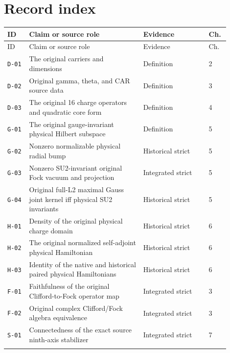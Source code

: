 \section{Record index}
\begingroup\small
\begin{longtable}{@{}p{0.09\linewidth}p{0.47\linewidth}p{0.27\linewidth}p{0.07\linewidth}@{}}
\toprule
ID & Claim or source role & Evidence & Ch. \\
\midrule\endfirsthead
\toprule
ID & Claim or source role & Evidence & Ch. \\
\midrule\endhead
\texttt{D-01} & The original carriers and dimensions & Definition & 2 \\
\addlinespace[0.15em]
\texttt{D-02} & Original gamma, theta, and CAR source data & Definition & 3 \\
\addlinespace[0.15em]
\texttt{D-03} & The original 16 charge operators and quadratic core form & Definition & 4 \\
\addlinespace[0.15em]
\texttt{G-01} & The original gauge-invariant physical Hilbert subspace & Definition & 5 \\
\addlinespace[0.15em]
\texttt{G-02} & Nonzero normalizable physical radial bump & Historical strict & 5 \\
\addlinespace[0.15em]
\texttt{G-03} & Nonzero SU2-invariant original Fock vacuum and projection & Integrated strict & 5 \\
\addlinespace[0.15em]
\texttt{G-04} & Original full-L2 maximal Gauss joint kernel iff physical SU2 invariants & Historical strict & 5 \\
\addlinespace[0.15em]
\texttt{H-01} & Density of the original physical charge domain & Historical strict & 6 \\
\addlinespace[0.15em]
\texttt{H-02} & The original normalized self-adjoint physical Hamiltonian & Historical strict & 6 \\
\addlinespace[0.15em]
\texttt{H-03} & Identity of the native and historical paired physical Hamiltonians & Historical strict & 6 \\
\addlinespace[0.15em]
\texttt{F-01} & Faithfulness of the original Clifford-to-Fock operator map & Integrated strict & 3 \\
\addlinespace[0.15em]
\texttt{F-02} & Original complex Clifford/Fock algebra equivalence & Integrated strict & 3 \\
\addlinespace[0.15em]
\texttt{S-01} & Connectedness of the exact source ninth-axis stabilizer & Integrated strict & 7 \\
\addlinespace[0.15em]

\end{longtable}
